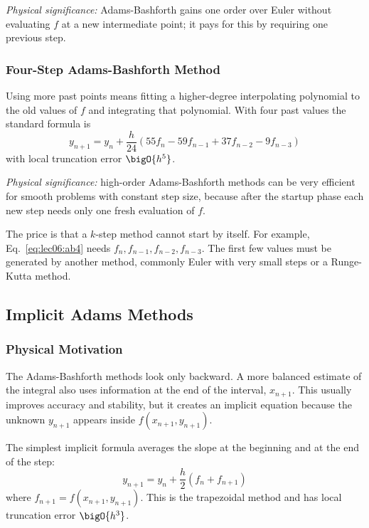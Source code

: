 \textit{Physical significance:} Adams-Bashforth gains one order over Euler
without evaluating $f$ at a new intermediate point; it pays for this by
requiring one previous step.

\subsubsection{Four-Step Adams-Bashforth Method}
Using more past points means fitting a higher-degree interpolating polynomial
to the old values of $f$ and integrating that polynomial. With four past
values the standard formula is
\begin{equation}
    \boxed{
    y_{n+1}
    =y_n+\frac{h}{24}\left(
    55f_n-59f_{n-1}+37f_{n-2}-9f_{n-3}
    \right)}
    \label{eq:lec06:ab4}
\end{equation}
with local truncation error $\bigO{h^5}$.

\textit{Physical significance:} high-order Adams-Bashforth methods can be
very efficient for smooth problems with constant step size, because after the
startup phase each new step needs only one fresh evaluation of $f$.

The price is that a $k$-step method cannot start by itself. For example,
Eq.~\eqref{eq:lec06:ab4} needs $f_n,f_{n-1},f_{n-2},f_{n-3}$. The first few
values must be generated by another method, commonly Euler with very small
steps or a Runge-Kutta method.

\subsection{Implicit Adams Methods}
\label{subsec:lec06:adams-moulton}

\subsubsection*{Physical Motivation}
The Adams-Bashforth methods look only backward. A more balanced estimate of
the integral also uses information at the end of the interval,
$x_{n+1}$. This usually improves accuracy and stability, but it creates an
implicit equation because the unknown $y_{n+1}$ appears inside
$f(x_{n+1},y_{n+1})$.

The simplest implicit formula averages the slope at the beginning and at the
end of the step:
\begin{equation}
    \boxed{
    y_{n+1}
    =y_n+\frac{h}{2}\left(f_n+f_{n+1}\right)}
    \label{eq:lec06:trapezoidal-method}
\end{equation}
where $f_{n+1}=f(x_{n+1},y_{n+1})$. This is the trapezoidal method and has
local truncation error $\bigO{h^3}$.

